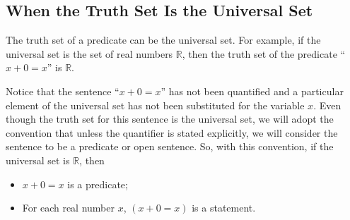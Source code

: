 \subsection*{When the Truth Set Is the Universal Set}
The truth set of a predicate can be the universal set.  For example, if the universal set is the set of real numbers $\mathbb{R}$, then the truth set of the predicate ``$x + 0 = x$''
is $\mathbb{R}$.  

Notice that the sentence ``$x + 0 = x$'' has not been quantified and a particular element of the universal set has not been substituted for the variable $x$.  Even though the truth set for this sentence is the universal set, we will adopt the convention that unless the quantifier is stated explicitly, we will consider the sentence to be a predicate or open sentence.  So, with this convention, if the universal set is $\mathbb{R}$, then
\begin{itemize}
\item $x + 0 = x$ is a predicate;

\item For each real number $x$, $\left( x + 0 = x \right)$ is a statement.
\end{itemize}
\hbreak

\endinput
